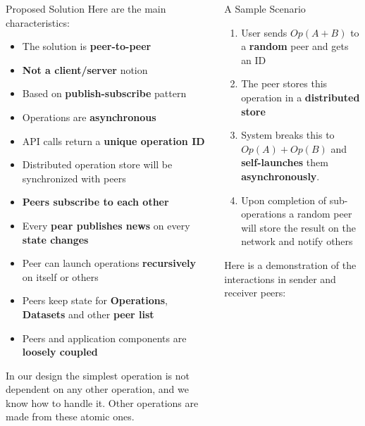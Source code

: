 \documentclass[final,hyperref={pdfpagelabels=true}]{beamer}
\begin{document}
\begin{frame}
\begin{columns}[t]
\begin{column}{.45\textwidth}
\begin{block}{Proposed Solution}
       Here are the main characteristics:
      \begin{itemize}
      \item The solution is \textbf{peer-to-peer}
      \item \textbf{Not a client/server} notion
      \item Based on \textbf{publish-subscribe} pattern
      \item Operations are \textbf{asynchronous}
      \item API calls return a \textbf{unique operation ID}
      \item Distributed operation store will be synchronized with peers
      \item \textbf{Peers subscribe to each other}
      \item Every \textbf{pear publishes news} on every \textbf{state changes}
      \item Peer can launch operations \textbf{recursively} on itself or others
      \item Peers keep state for \textbf{Operations}, \textbf{Datasets} and other \textbf{peer list}
      \item Peers and application components are \textbf{loosely coupled}
      \end{itemize}
      
      In our design the simplest operation is not dependent on any other operation, and we know how to handle it. Other operations are made from these atomic ones.
      
      \end{block}
      
    \end{column}

    \begin{column}{.45\textwidth}

      \begin{block}{A Sample Scenario}
      \begin{enumerate}
      \item User sends \(Op(A + B) \) to a \textbf{random} peer and gets an ID
      \item The peer stores this operation in a \textbf{distributed store}
      \item System breaks this to \(Op(A) + Op(B) \) and \textbf{self-launches} them \textbf{asynchronously}.
      \item Upon completion of sub-operations a random peer will store the result on the network and notify others
      \end{enumerate}
        Here is a demonstration of the interactions in sender and receiver peers:
 

\end{block}
\end{column}
\end{columns}
\end{frame}
\end{document}
